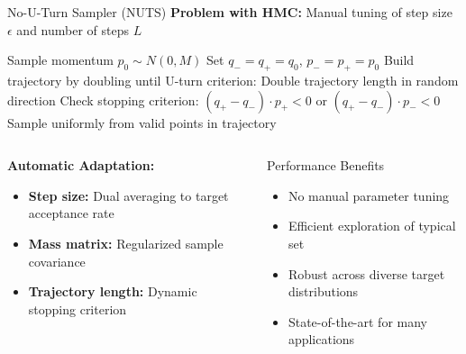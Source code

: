 \documentclass[aspectratio=169,11pt]{beamer}
\begin{document}
\begin{frame}{No-U-Turn Sampler (NUTS)}
\textbf{Problem with HMC:} Manual tuning of step size $\epsilon$ and number of steps $L$

\begin{algorithm}[H]
\caption{NUTS Algorithm (Simplified)}
\begin{algorithmic}[1]
\STATE Sample momentum $p_0 \sim N(0, M)$
\STATE Set $q_- = q_+ = q_0$, $p_- = p_+ = p_0$
\STATE Build trajectory by doubling until U-turn criterion:
\STATE Double trajectory length in random direction
\STATE Check stopping criterion: $(q_+ - q_-) \cdot p_+ < 0$ or $(q_+ - q_-) \cdot p_- < 0$
\ENDWHILE
\STATE Sample uniformly from valid points in trajectory
\end{algorithmic}
\end{algorithm}

\begin{columns}
\begin{column}{0.5\textwidth}
\textbf{Automatic Adaptation:}
\begin{itemize}
\item \textbf{Step size:} Dual averaging to target acceptance rate
\item \textbf{Mass matrix:} Regularized sample covariance
\item \textbf{Trajectory length:} Dynamic stopping criterion
\end{itemize}
\end{column}
\begin{column}{0.5\textwidth}
\begin{block}{Performance Benefits}
\begin{itemize}
\item No manual parameter tuning
\item Efficient exploration of typical set
\item Robust across diverse target distributions
\item State-of-the-art for many applications
\end{itemize}
\end{block}
\end{column}
\end{columns}
\end{frame}
\end{document}
